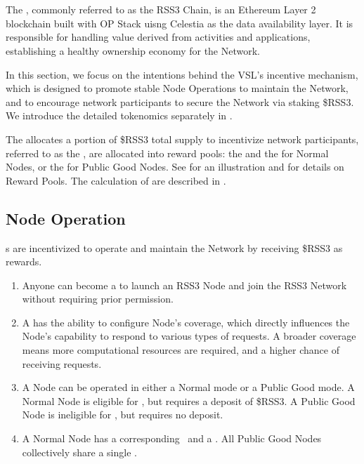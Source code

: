 \section{}
\label{sec:VSL}

The , commonly referred to as the RSS3 Chain, is an Ethereum Layer 2 blockchain built with OP Stack uisng Celestia as the data availability layer.
It is responsible for handling value derived from  activities and applications, establishing a healthy ownership economy for the Network.

In this section, we focus on the intentions behind the \gls{VSL}'s incentive mechanism, which is designed to promote stable Node Operations to maintain the Network, and to encourage network participants to secure the Network via staking \$RSS3.
We introduce the detailed tokenomics separately in .

The  allocates a portion of \$RSS3 total supply to incentivize network participants, referred to as the , 
are allocated into reward pools: the  and the  for Normal Nodes, or the  for Public Good Nodes.
See  for an illustration and  for details on Reward Pools.
The calculation of  are described in .

\subsection{Node Operation}
s are incentivized to operate and maintain the Network by receiving \$RSS3 as rewards.
\begin{enumerate}
    \item Anyone can become a  to launch an RSS3 Node and join the RSS3 Network without requiring prior permission.
    \item A  has the ability to configure Node's coverage, which directly influences the Node's capability to respond to various types of requests. A broader coverage means more computational resources are required, and a higher chance of receiving requests.
    \item A Node can be operated in either a Normal mode or a Public Good mode. A Normal Node is eligible for , but requires a deposit of \$RSS3. A Public Good Node is ineligible for , but requires no deposit.
    \item A Normal Node has a corresponding \operationPool\ and a \stakingPool. All Public Good Nodes collectively share a single \publicGoodPool.
\end{enumerate}

